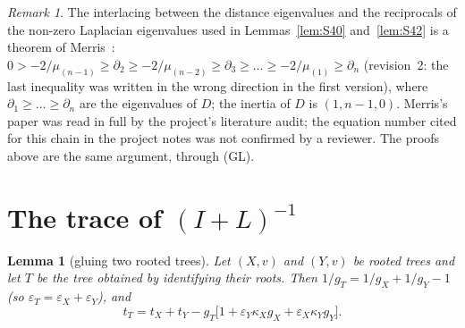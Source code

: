 \documentclass[11pt]{amsart}
\newtheorem{lemma}[theorem]{Lemma}
\theoremstyle{definition}
\theoremstyle{remark}
\newtheorem{remark}[theorem]{Remark}
\begin{document}
\begin{remark}
The interlacing between the distance eigenvalues and the reciprocals of the
non-zero Laplacian eigenvalues used in Lemmas~\ref{lem:S40}
and~\ref{lem:S42} is a theorem of Merris~\cite{Mer90}:
$0>-2/\mu_{(n-1)}\ge\partial_2\ge-2/\mu_{(n-2)}\ge\partial_3\ge\dots\ge-2/\mu_{(1)}\ge\partial_n$
(revision~2: the last inequality was written in the wrong direction in the
first version),
where $\partial_1\ge\dots\ge\partial_n$ are the eigenvalues of $D$; the
inertia of $D$ is $(1,n-1,0)$. Merris's paper was read in full by the
project's literature audit; the equation number cited for this chain in the
project notes was not confirmed by a reviewer. The proofs above are the
same argument, through (GL).
\end{remark}

\section{The trace of \texorpdfstring{$(I+L)^{-1}$}{(I+L)\^{}(-1)}}\label{sec:trace}

\begin{lemma}[gluing two rooted trees]\label{lem:S43}
Let $(X,v)$ and $(Y,v)$ be rooted trees and let $T$ be the tree obtained by
identifying their roots. Then $1/g_T=1/g_X+1/g_Y-1$ (so
$\varepsilon_T=\varepsilon_X+\varepsilon_Y$), and
\[
t_T=t_X+t_Y-g_T\bigl[1+\varepsilon_Y\kappa_Xg_X+\varepsilon_X\kappa_Yg_Y\bigr].
\]
\end{lemma}
\end{document}
